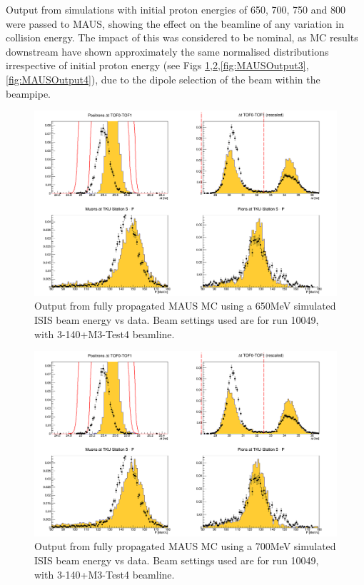 \documentclass[a4paper,11pt]{article}
\begin{document}
Output from simulations with initial proton energies of 650, 700, 750 and 800 were passed to MAUS, showing the effect on the beamline of any variation in collision energy. The impact of this was considered to be nominal, as MC results downstream have shown approximately the same normalised distributions irrespective of initial proton energy (see Figs \ref{fig:MAUSOutput1},\ref{fig:MAUSOutput2},\ref{fig:MAUSOutput3},\ref{fig:MAUSOutput4}), due to the dipole selection of the beam within the beampipe.



\begin{figure}[b!]
  \begin{center}
    \includegraphics[width=1.0\columnwidth]{./figures/3-140+M3-Test4_650MeV_RecoMC_data.png}
    \caption{Output from fully propagated MAUS MC using a 650MeV simulated ISIS beam energy vs data. Beam settings used are for run 10049, with 3-140+M3-Test4 beamline.}
    \label{fig:MAUSOutput1}
  \end{center}
\end{figure}

\begin{figure}
  \begin{center}
    \includegraphics[width=1.0\columnwidth]{./figures/3-140+M3-Test4_700MeV_RecoMC_data.png}
    \caption{Output from fully propagated MAUS MC using a 700MeV simulated ISIS beam energy vs data. Beam settings used are for run 10049, with 3-140+M3-Test4 beamline.}
    \label{fig:MAUSOutput2}
  \end{center}
\end{figure}
\end{document}
